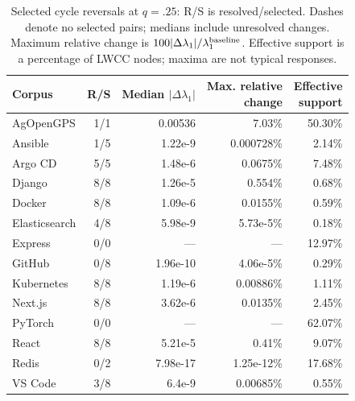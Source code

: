 \begin{table}[t]
\caption{Selected cycle reversals at $q=.25$: R/S is resolved/selected.
Dashes denote no selected pairs; medians include unresolved changes.
Maximum relative change is $100|\Delta\lambda_1|/\lambda_1^{\rm baseline}$.
Effective support is a percentage of LWCC nodes; maxima are not typical responses.}
\label{tab:matched}
\centering
\begin{tabular}{@{}lrrrr@{}}
\toprule
Corpus & R/S & \shortstack{Median\\$|\Delta\lambda_1|$} & \shortstack{Max. relative\\change} & \shortstack{Effective\\support}\\
\midrule
AgOpenGPS & 1/1 & 0.00536 & 7.03\% & 50.30\% \\
Ansible & 1/5 & 1.22e-9 & 0.000728\% & 2.14\% \\
Argo CD & 5/5 & 1.48e-6 & 0.0675\% & 7.48\% \\
Django & 8/8 & 1.26e-5 & 0.554\% & 0.68\% \\
Docker & 8/8 & 1.09e-6 & 0.0155\% & 0.59\% \\
Elasticsearch & 4/8 & 5.98e-9 & 5.73e-5\% & 0.18\% \\
Express & 0/0 & --- & --- & 12.97\% \\
GitHub & 0/8 & 1.96e-10 & 4.06e-5\% & 0.29\% \\
Kubernetes & 8/8 & 1.19e-6 & 0.00886\% & 1.11\% \\
Next.js & 8/8 & 3.62e-6 & 0.0135\% & 2.45\% \\
PyTorch & 0/0 & --- & --- & 62.07\% \\
React & 8/8 & 5.21e-5 & 0.41\% & 9.07\% \\
Redis & 0/2 & 7.98e-17 & 1.25e-12\% & 17.68\% \\
VS Code & 3/8 & 6.4e-9 & 0.00685\% & 0.55\% \\
\bottomrule
\end{tabular}
\end{table}
